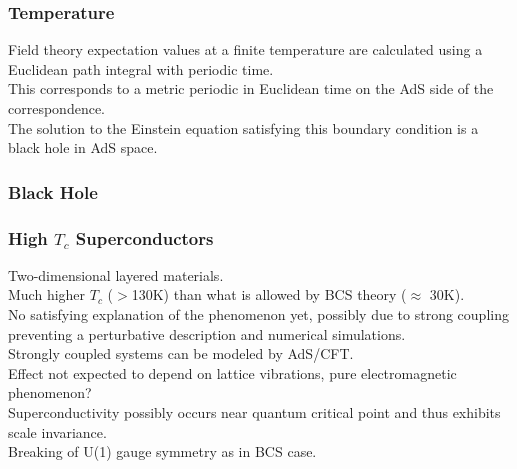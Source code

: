 \documentclass{beamer}
\begin{document}
\begin{frame}
\frametitle{Temperature}
Field theory expectation values at a finite temperature are calculated using a Euclidean path integral with periodic time.\\
This corresponds to a metric periodic in Euclidean time on the AdS side of the correspondence.\\
The solution to the Einstein equation satisfying this boundary condition is a black hole in AdS space.
\end{frame}

\begin{frame}
\frametitle{Black Hole}
\begin{figure}
 \centering
{}
\end{figure}
\end{frame}


\begin{frame}
\frametitle{High $T_c$ Superconductors}
Two-dimensional layered materials.\\
Much higher $T_c$ ($>$130K) than what is allowed by BCS theory ($\approx$ 30K).\\
No satisfying explanation of the phenomenon yet, possibly due to strong coupling preventing a perturbative description and numerical simulations.\\
Strongly coupled systems can be modeled by AdS/CFT.\\
\vspace{0.3cm}
Effect not expected to depend on lattice vibrations, pure electromagnetic phenomenon?\\
Superconductivity possibly occurs near quantum critical point and thus exhibits scale invariance.\\
Breaking of U(1) gauge symmetry as in BCS case.
\end{frame}
\end{document}
